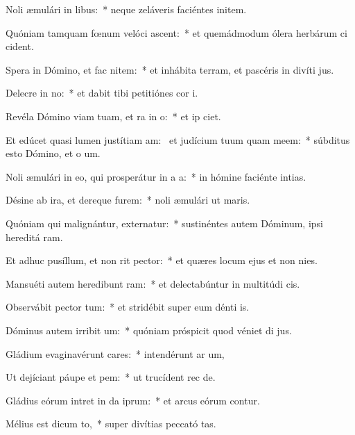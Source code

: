 \item Noli æmulári in libus:~* neque zeláveris faciéntes initem.
\item Quóniam tamquam fœnum velóci ascent:~* et quemádmodum ólera herbárum ci cident.
\item Spera in Dómino, et fac nitem:~* et inhábita terram, et pascéris in divíti jus.
\item Delecre in no:~* et dabit tibi petitiónes cor i.
\item Revéla Dómino viam tuam, et ra in o:~* et ip ciet.
\item Et edúcet quasi lumen justítiam am:~\pscross{} et judícium tuum quam meem:~* súbditus esto Dómino, et o um.
\item Noli æmulári in eo, qui prosperátur in a a:~* in hómine faciénte intias.
\item Désine ab ira, et dereque furem:~* noli æmulári ut maris.
\item Quóniam qui malignántur, externatur:~* sustinéntes autem Dóminum, ipsi hereditá ram.
\item Et adhuc pusíllum, et non rit pector:~* et quæres locum ejus et non nies.
\item Mansuéti autem heredibunt ram:~* et delectabúntur in multitúdi cis.
\item Observábit pector tum:~* et stridébit super eum dénti is.
\item Dóminus autem irribit um:~* quóniam próspicit quod véniet di jus.
\item Gládium evaginavérunt cares:~* intendérunt ar um,
\item Ut dejíciant páupe et pem:~* ut trucídent rec de.
\item Gládius eórum intret in da iprum:~* et arcus eórum contur.
\item Mélius est dicum to,~* super divítias peccató tas.
